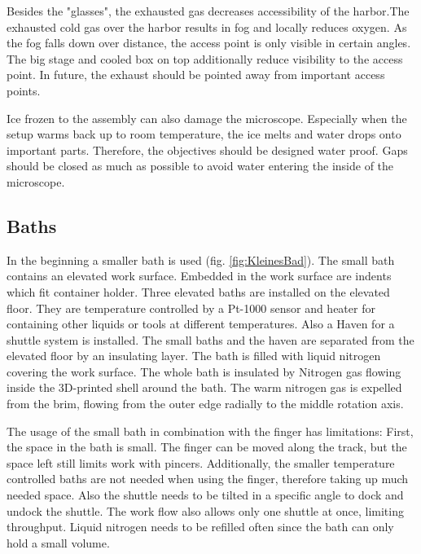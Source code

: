 Besides the "glasses", the exhausted gas decreases accessibility of the harbor.The exhausted cold gas over the harbor results in fog and locally reduces oxygen. As the fog falls down over distance, the access point is only visible in certain angles.
The big stage and cooled box on top additionally reduce visibility to the access point. In future, the exhaust should be pointed away from important access points.

Ice frozen to the assembly can also damage the microscope. Especially when the setup warms back up to room temperature, the ice melts and water drops onto important parts. Therefore, the objectives should be designed water proof. Gaps should be closed as much as possible to avoid water entering the inside of the microscope.

\subsection{Baths}

In the beginning a smaller bath is used (fig. \ref{fig:KleinesBad}). The small bath contains an elevated work surface. Embedded in the work surface are indents which fit container holder. Three elevated baths are installed on the elevated floor. They are temperature controlled by a Pt-1000 sensor and heater for containing other liquids or tools at different temperatures. Also a Haven for a shuttle system is installed. The small baths and the haven are separated from the elevated floor by an insulating layer. The bath is filled with liquid nitrogen covering the work surface. The whole bath is insulated by Nitrogen gas flowing inside the 3D-printed shell around the bath. The warm nitrogen gas is expelled from the brim, flowing from the outer edge radially to the middle rotation axis.

The usage of the small bath in combination with the finger has limitations: First, the space in the bath is small. The finger can be moved along the track, but the space left still limits work with pincers. Additionally, the smaller temperature controlled baths are not needed when using the finger, therefore taking up much needed space. Also the shuttle needs to be tilted in a specific angle to dock and undock the shuttle. The work flow also allows only one shuttle at once, limiting throughput. Liquid nitrogen needs to be refilled often since the bath can only hold a small volume.

